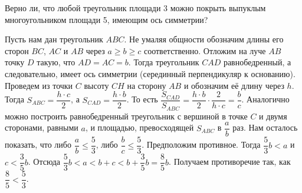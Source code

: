 \problem
Верно ли, что любой треугольник площади 3 можно покрыть выпуклым
многоугольником площади 5, имеющим ось симметрии?

\solution
Пусть нам дан треугольник $ABC$.
Не умаляя общности обозначим длины его сторон $BC$, $AC$ и $AB$ через
$a \geq b \geq c$ соответственно.
Отложим на луче $AB$ точку $D$ такую, что $AD = AC = b$.
Тогда треугольник $CAD$ равнобедренный, а следовательно, имеет ось симметрии
(серединный перпендикуляр к основанию).
Проведем из точки $C$ высоту $CH$ на сторону $AB$ и обозначим её длину через
$h$.
Тогда $S_{ABC} = \dfrac{h \cdot c}{2}$, а $S_{CAD} = \dfrac{h \cdot b}{2}$.
То есть
\(
    \dfrac{S_{CAD}}{S_{ABC}}
=
    \dfrac{h \cdot b}{2} \cdot \dfrac{2}{h \cdot c}
=
    \dfrac{b}{c}
\).
Аналогично можно построить равнобедренный треугольник с вершиной в точке $C$ и
двумя сторонами, равными $a$, и площадью, превосходящей $S_{ABC}$ в
$\dfrac{a}{b}$ раз.
Нам осталось показать, что либо $\dfrac{a}{b} \leq \dfrac{5}{3}$, либо
$\dfrac{b}{c} \leq \dfrac{5}{3}$.
Предположим противное.
Тогда $\dfrac{5}{3} b < a$ и $c < \dfrac{3}{5} b$.
Отсюда $\dfrac{5}{3} b < a < b + c < b + \dfrac{3}{5} b = \dfrac{8}{5} b$.
Получаем противоречие так, как $\dfrac{8}{5} < \dfrac{5}{3}$.

\endproblem
